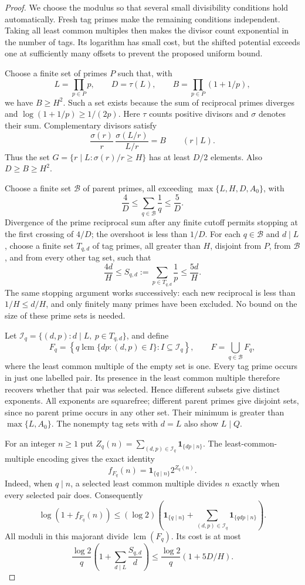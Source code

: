 \documentclass[11pt]{article}
\theoremstyle{plain}
\theoremstyle{definition}
\theoremstyle{remark}
\begin{document}
\begin{proof}
We choose the modulus so that several small divisibility conditions hold
automatically. Fresh tag primes make the remaining conditions independent.
Taking all least common multiples then makes the divisor count
exponential in the number of tags. Its logarithm has small cost, but the
shifted potential exceeds one at sufficiently many offsets to prevent
the proposed uniform bound.

Choose a finite set of primes $P$ such that, with
\[
 L=\prod_{p\in P}p,\qquad D=\tau(L),\qquad
 B=\prod_{p\in P}(1+1/p),
\]
we have $B\ge H^2$.  Such a set exists because the sum of reciprocal primes
diverges and $\log(1+1/p)\ge1/(2p)$.
Here $\tau$ counts positive divisors and $\sigma$ denotes their sum.
Complementary divisors satisfy
\[
 \frac{\sigma(r)}r\,
 \frac{\sigma(L/r)}{L/r}=B\qquad(r\mid L).
\]
Thus the set
$G=\{r\mid L:\sigma(r)/r\ge H\}$ has at least $D/2$ elements.
Also $D\ge B\ge H^2$.

Choose a finite set $\mathcal B$ of parent primes, all exceeding
$\max\{L,H,D,A_0\}$, with
\[
 \frac4D\le\sum_{q\in\mathcal B}\frac1q\le\frac5D.
\]
Divergence of the prime reciprocal sum after any finite cutoff permits
stopping at the first crossing of $4/D$; the overshoot is less than $1/D$.
For each $q\in\mathcal B$ and $d\mid L$, choose a finite set $T_{q,d}$
of tag primes, all greater than $H$, disjoint from $P$, from $\mathcal B$,
and from every other tag set, such that
\[
 \frac{4d}{H}\le S_{q,d}:=\sum_{p\in T_{q,d}}\frac1p\le\frac{5d}{H}.
\]
The same stopping argument works successively: each new reciprocal is
less than $1/H\le d/H$, and only finitely many primes have been excluded.
No bound on the size of these prime sets is needed.

Let $\mathcal I_q=\{(d,p):d\mid L,\ p\in T_{q,d}\}$, and define
\[
 F_q=\left\{q\operatorname{lcm}\{dp:(d,p)\in I\}:
                         I\subseteq\mathcal I_q\right\},
 \qquad F=\bigcup_{q\in\mathcal B}F_q,
\]
where the least common multiple of the empty set is one.
Every tag prime occurs in just one labelled pair.  Its presence in the
least common multiple therefore recovers whether that pair was selected.
Hence different subsets give distinct exponents.  All exponents are
squarefree; different parent primes give disjoint sets, since no parent
prime occurs in any other set.  Their minimum is greater than
$\max\{L,A_0\}$.  The nonempty tag sets with $d=L$ also show $L\mid Q$.

For an integer $n\ge1$ put
$Z_q(n)=\sum_{(d,p)\in\mathcal I_q}\mathbf1_{\{dp\mid n\}}$.
The least-common-multiple encoding gives the exact identity
\[
 f_{F_q}(n)=\mathbf1_{\{q\mid n\}}2^{Z_q(n)}.
\]
Indeed, when $q\mid n$, a selected least common multiple divides $n$
exactly when every selected pair does.  Consequently
\[
 \log(1+f_{F_q}(n))
 \le(\log2)\left(\mathbf1_{\{q\mid n\}}
          +\sum_{(d,p)\in\mathcal I_q}\mathbf1_{\{qdp\mid n\}}\right).
\]
All moduli in this majorant divide $\operatorname{lcm}(F_q)$.
Its cost is at most
\begin{equation}
 \frac{\log2}{q}\left(1+\sum_{d\mid L}\frac{S_{q,d}}d\right)
 \le\frac{\log2}{q}(1+5D/H).
 \label{eq:257-parent-log-cost}
\end{equation}


\end{proof}
\end{document}
